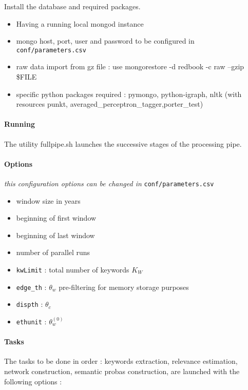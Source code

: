 Install the database and required packages.

\begin{itemize}
\item Having a running local mongod instance
\item mongo host, port, user and password to be configured in \texttt{conf/parameters.csv}
\item raw data import from gz file : use mongorestore -d redbook -c raw --gzip {\$}FILE
\item specific python packages required : pymongo, python-igraph, nltk (with resources punkt, averaged{\_}perceptron{\_}tagger,porter{\_}test)
\end{itemize}

\paragraph{Running}

The utility fullpipe.sh launches the successive stages of the processing pipe.

\paragraph{Options}

\textit{this configuration options can be changed in }\texttt{conf/parameters.csv}

\begin{itemize}
\item window size in years
\item beginning of first window
\item beginning of last window
\item number of parallel runs
\item \texttt{kwLimit} : total number of keywords $K_W$
\item \texttt{edge{\_}th} : $\theta_w$ pre-filtering for memory storage purposes
\item \texttt{dispth} : $\theta_c$
\item \texttt{ethunit} : $\theta_w^{(0)}$
\end{itemize}

\paragraph{Tasks}

The tasks to be done in order : keywords extraction, relevance estimation, network construction, semantic probas construction, are launched with the following options :

